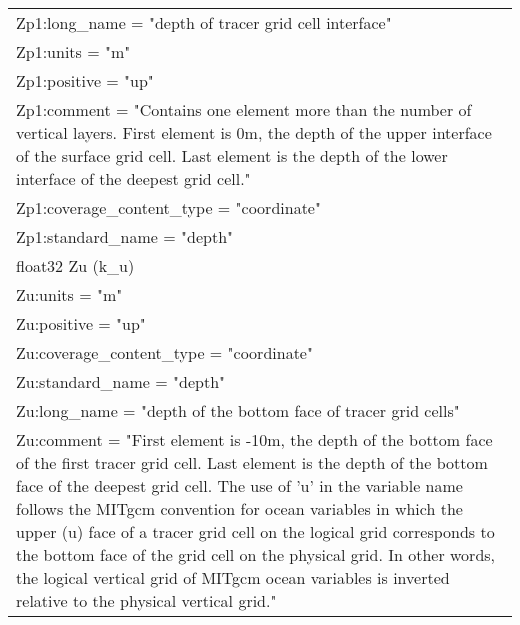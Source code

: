 \begin{longtable}{|p{\textwidth}|}
\rowcolor{Apricot}\hspace{0.5cm}\hspace{0.5cm}Zp1:long\_name = "depth of tracer grid cell interface"\\
\rowcolor{Apricot}\hspace{0.5cm}\hspace{0.5cm}Zp1:units = "m"\\
\rowcolor{Apricot}\hspace{0.5cm}\hspace{0.5cm}Zp1:positive = "up"\\
\rowcolor{Apricot}\hspace{0.5cm}\hspace{0.5cm}Zp1:comment = "Contains one element more than the number of vertical layers. First element is 0m, the depth of the upper interface of the surface grid cell. Last element is the depth of the lower interface of the deepest grid cell."\\
\rowcolor{Apricot}\hspace{0.5cm}\hspace{0.5cm}Zp1:coverage\_content\_type = "coordinate"\\
\rowcolor{Apricot}\hspace{0.5cm}\hspace{0.5cm}Zp1:standard\_name = "depth"\\
\rowcolor{Apricot}\hspace{0.5cm}float32 Zu (k\_u)\\
\rowcolor{Apricot}\hspace{0.5cm}\hspace{0.5cm}Zu:units = "m"\\
\rowcolor{Apricot}\hspace{0.5cm}\hspace{0.5cm}Zu:positive = "up"\\
\rowcolor{Apricot}\hspace{0.5cm}\hspace{0.5cm}Zu:coverage\_content\_type = "coordinate"\\
\rowcolor{Apricot}\hspace{0.5cm}\hspace{0.5cm}Zu:standard\_name = "depth"\\
\rowcolor{Apricot}\hspace{0.5cm}\hspace{0.5cm}Zu:long\_name = "depth of the bottom face of tracer grid cells"\\
\rowcolor{Apricot}\hspace{0.5cm}\hspace{0.5cm}Zu:comment = "First element is -10m, the depth of the bottom face of the first tracer grid cell. Last element is the depth of the bottom face of the deepest grid cell. The use of 'u' in the variable name follows the MITgcm convention for ocean variables in which the upper (u) face of a tracer grid cell on the logical grid corresponds to the bottom face of the grid cell on the physical grid. In other words, the logical vertical grid of MITgcm ocean variables is inverted relative to the physical vertical grid."\\

\end{longtable}
